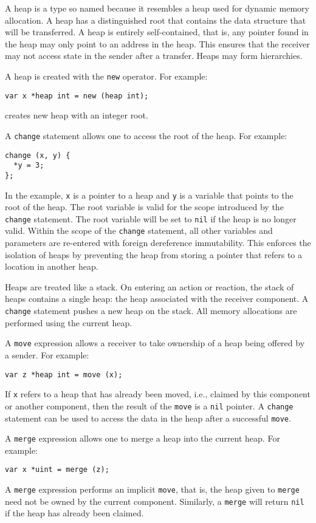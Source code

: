 A heap is a type so named because it resembles a heap used for dynamic memory allocation.
A heap has a distinguished root that contains the data structure that will be transferred.
A heap is entirely self-contained, that is, any pointer found in the heap may only point to an address in the heap.
This ensures that the receiver may not access state in the sender after a transfer.
Heaps may form hierarchies.

A heap is created with the \verb+new+ operator.
For example:
\begin{verbatim}
var x *heap int = new (heap int);
\end{verbatim}
creates new heap with an integer root.

A \verb+change+ statement allows one to access the root of the heap.
For example:
\begin{verbatim}
change (x, y) {
  *y = 3;
};
\end{verbatim}
In the example, \verb+x+ is a pointer to a heap and \verb+y+ is a variable that points to the root of the heap.
The root variable is valid for the scope introduced by the \verb+change+ statement.
The root variable will be set to \verb+nil+ if the heap is no longer valid.
Within the scope of the \verb+change+ statement, all other variables and parameters are re-entered with foreign dereference immutability.
This enforces the isolation of heaps by preventing the heap from storing a pointer that refers to a location in another heap.

Heaps are treated like a stack.
On entering an action or reaction, the stack of heaps contains a single heap:  the heap associated with the receiver component.
A \verb+change+ statement pushes a new heap on the stack.
All memory allocations are performed using the current heap.

A \verb+move+ expression allows a receiver to take ownership of a heap being offered by a sender.
For example:
\begin{verbatim}
var z *heap int = move (x);
\end{verbatim}
If \verb+x+ refers to a heap that has already been moved, i.e., claimed by this component or another component, then the result of the \verb+move+ is a \verb+nil+ pointer.
A \verb+change+ statement can be used to access the data in the heap after a successful \verb+move+.

A \verb+merge+ expression allows one to merge a heap into the current heap.
For example:
\begin{verbatim}
var x *uint = merge (z);
\end{verbatim}
A \verb+merge+ expression performs an implicit \verb+move+, that is, the heap given to \verb+merge+ need not be owned by the current component.
Similarly, a \verb+merge+ will return \verb+nil+ if the heap has already been claimed.

